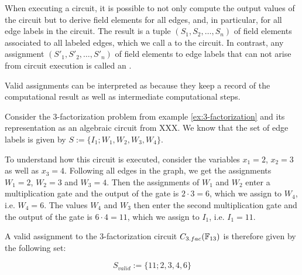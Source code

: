 When executing a circuit, it is possible to not only compute the output values of the circuit but to derive field elements for all edges, and, in particular, for all edge labels in the circuit. The result is a tuple $(S_1,S_2,\ldots, S_n)$ of field elements associated to all labeled edges, which we call a  to the circuit. In contrast, any assignment $(S'_1,S'_2,\ldots, S'_n)$ of field elements to edge labels that can not arise from circuit execution is called an .

Valid assignments can be interpreted as  because they keep a record of the computational result as well as intermediate computational steps. 
\begin{example}[3-factorization] Consider the $3$-factorization problem from example \ref{ex:3-factorization} and its representation as an algebraic circuit from XXX. We know that the set of edge labels is given by $S:=\{I_{1};W_{1},W_{2},W_{3}, W_{4}\}$. 

To understand how this circuit is executed, consider the variables $x_1=2$, $x_2=3$ as well as $x_3=4$. Following all edges in the graph, we get the assignments $W_1=2$, $W_2=3$ and $W_3=4$. Then the assignments of $W_1$ and $W_2$ enter a multiplication gate and the output of the gate is $2\cdot 3 = 6$, which we assign to $W_4$, i.e. $W_4=6$. The values $W_4$ and $W_3$ then enter the second multiplication gate and the output of the gate is $6\cdot 4 = 11$, which we assign to $I_1$, i.e. $I_1=11$. 

A valid assignment to the 3-factorization circuit $C_{3.fac}(\mathbb{F}_{13})$ is therefore given by the following set:

\begin{equation}\label{C3fac}
S_{valid}:=\{11;2,3,4,6\}
\end{equation}


\end{example}
